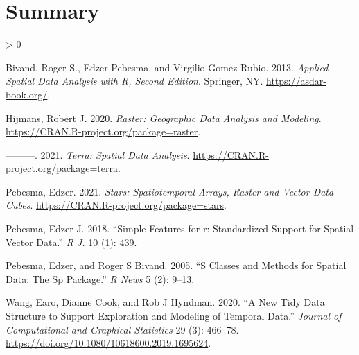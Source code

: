 \documentclass{article}
\newlength{\cslhangindent}
\newenvironment{CSLReferences}[2] %
 {%
  \setlength{\parindent}{0pt}
  \ifodd #1 \everypar{\setlength{\hangindent}{\cslhangindent}}\ignorespaces\fi
  \ifnum #2 > 0
  \setlength{\parskip}{#2\baselineskip}
  \fi
 }%
 {}
\begin{document}
\hypertarget{summary}{%
\section*{Summary}\label{summary}}

\hypertarget{refs}{}
\begin{CSLReferences}{1}{0}
\leavevmode\hypertarget{ref-spacetimebook}{}%
Bivand, Roger S., Edzer Pebesma, and Virgilio Gomez-Rubio. 2013.
\emph{Applied Spatial Data Analysis with {R}, Second Edition}. Springer,
NY. \url{https://asdar-book.org/}.

\leavevmode\hypertarget{ref-raster}{}%
Hijmans, Robert J. 2020. \emph{Raster: Geographic Data Analysis and
Modeling}. \url{https://CRAN.R-project.org/package=raster}.

\leavevmode\hypertarget{ref-terra}{}%
---------. 2021. \emph{Terra: Spatial Data Analysis}.
\url{https://CRAN.R-project.org/package=terra}.

\leavevmode\hypertarget{ref-stars}{}%
Pebesma, Edzer. 2021. \emph{Stars: Spatiotemporal Arrays, Raster and
Vector Data Cubes}. \url{https://CRAN.R-project.org/package=stars}.

\leavevmode\hypertarget{ref-pebesma2018simple}{}%
Pebesma, Edzer J. 2018. {``Simple Features for r: Standardized Support
for Spatial Vector Data.''} \emph{R J.} 10 (1): 439.

\leavevmode\hypertarget{ref-pebesma2005s}{}%
Pebesma, Edzer, and Roger S Bivand. 2005. {``S Classes and Methods for
Spatial Data: The Sp Package.''} \emph{R News} 5 (2): 9--13.

\leavevmode\hypertarget{ref-tsibbles}{}%
Wang, Earo, Dianne Cook, and Rob J Hyndman. 2020. {``A New Tidy Data
Structure to Support Exploration and Modeling of Temporal Data.''}
\emph{Journal of Computational and Graphical Statistics} 29 (3):
466--78. \url{https://doi.org/10.1080/10618600.2019.1695624}.

\end{CSLReferences}



\end{document}

